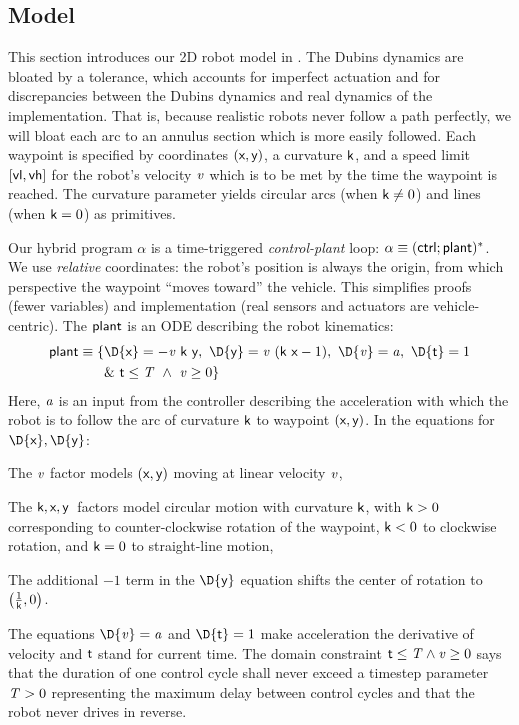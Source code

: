 \documentclass[12pt]{cmuthesis}
\theoremstyle{definition}
\theoremstyle{remark}
\begin{document}
\subsection{Model}
This section introduces our 2D robot model in \dL.
The Dubins dynamics are bloated by a tolerance, which accounts for imperfect actuation and for discrepancies between the Dubins dynamics and real dynamics of the implementation.
That is, because realistic robots never follow a path perfectly, we will bloat each arc to an annulus section which is more easily followed.
Each waypoint is specified by coordinates $(\textsf{x},\textsf{y})$, a curvature $\textsf{k}$, and a speed limit $[\textsf{vl},\textsf{vh}]$ for the robot's velocity ${\it v}$ which is to be met by the time the waypoint is reached.
The curvature parameter yields circular arcs (when $\textsf{k} \not= 0$) and lines (when $\textsf{k}=0$) as primitives.

Our hybrid program $\alpha$ is a time-triggered \emph{control-plant} loop: $\alpha\equiv(\textsf{ctrl};\textsf{plant})^*$.
We use \emph{relative} coordinates: the robot's position is always the origin, from which perspective the waypoint ``moves toward'' the vehicle.
This simplifies proofs (fewer variables) and implementation (real sensors and actuators are vehicle-centric).
The $\textsf{plant}$ is an ODE describing the robot kinematics:
\begin{align*}
\plant\equiv \{&\D{\xgvar}=-\vvar~\kvar~\ygvar,~\D{\ygvar}=\vvar~(\kvar~\xgvar-1),~\D{\vvar}=\avar,~\D{\tvar}=1 \\
 &\&~\tvar\leq \Tvar ~\land~ \vvar \geq 0\} %
\end{align*}
Here, ${\it a}$ is an input from the controller describing the acceleration with which the robot is to follow the arc of curvature $\textsf{k}$ to waypoint $(\textsf{x},\textsf{y})$.
In the equations for $\D{\xgvar},\D{\ygvar}$: \begin{inparaenum}[\it i)]\item The ${\it v}$ factor models $(\textsf{x},\textsf{y})$ moving at linear velocity ${\it v}$, \item The $\textsf{k},\textsf{x},\textsf{y}$\ factors model circular motion with curvature $\textsf{k}$, with $\textsf{k} > 0$ corresponding to counter-clockwise rotation of the waypoint, $\textsf{k} < 0$ to clockwise rotation, and $\textsf{k} = 0$ to straight-line motion, \item The additional $-1$ term in the $\D{\ygvar}$ equation shifts the center of rotation to $\left(\frac{1}{\textsf{k}},0\right)$.
\end{inparaenum}
The equations $\D{\vvar}=\avar$ and $\D{\tvar}=1$ make acceleration the derivative of velocity and $\textsf{t}$ stand for current time.
The domain constraint $\textsf{t} \leq {\it T} \land {\it v} \geq 0$ says that the duration of one control cycle shall never exceed a timestep parameter ${\it T} > 0$ representing the maximum delay between control cycles and that the robot never drives in reverse.
\end{document}
